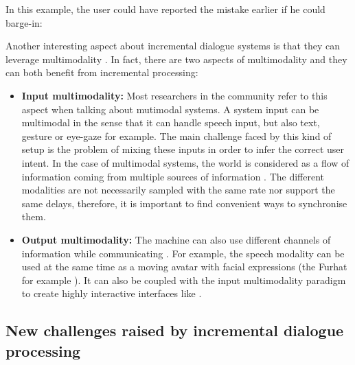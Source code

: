                     In this example, the user could have reported the mistake earlier if he could barge-in:
                    
                    \begin{dialogue}
                      \end{dialogue}
                      
                      Another interesting aspect about incremental dialogue systems is that they can leverage multimodality \cite{Fink1998}. In fact, there are two aspects of multimodality and they can both benefit from incremental processing:
                      
                      \begin{itemize}
                           \item \textbf{Input multimodality:} Most researchers in the community refer to this aspect when talking about mutimodal systems. A system input can be multimodal in the sense that it can handle speech input, but also text, gesture or eye-gaze for example. The main challenge faced by this kind of setup is the problem of mixing these inputs in order to infer the correct user intent. In the case of multimodal systems, the world is considered as a flow of information coming from multiple sources of information \cite{Chao2012,Rosenthal2013}. The different modalities are not necessarily sampled with the same rate nor support the same delays, therefore, it is important to find convenient ways to synchronise them.
                                \item \textbf{Output multimodality:} The machine can also use different channels of information while communicating \cite{Matthias2009}. For example, the speech modality can be used at the same time as a moving avatar with facial expressions (the Furhat for example \cite{Skantze2015}). It can also be coupled with the input multimodality paradigm to create highly interactive interfaces like \cite{Johnston2014}.
                                  \end{itemize}
                                  

                                  \subsection{New challenges raised by incremental dialogue processing}
                                  \label{soa:challengesincr}
    
